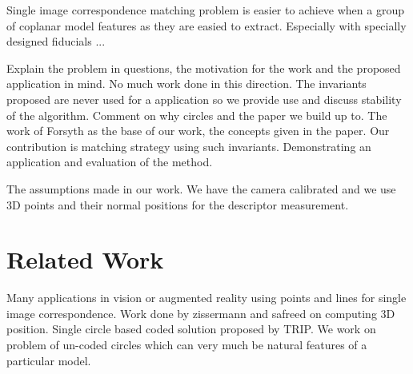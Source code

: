 \documentclass{bmvc2k}
\begin{document}
Single image correspondence matching problem is easier to achieve when a group of coplanar model features as they are easied to 
extract. Especially with specially designed fiducials ...    

Explain the problem in questions, the motivation for the work and the proposed application in mind.
No much work done in this direction. The invariants proposed are never used for a application so we provide use and discuss stability of the algorithm. Comment on why circles and the paper we build up to. 
The work of Forsyth as the base of our work, the concepts given in the paper. Our contribution is matching strategy using such invariants. Demonstrating an application and evaluation of the method. 

The assumptions made in our work. We have the camera calibrated and we use 3D points and their normal positions for the descriptor measurement. 




\section{Related Work}

Many applications in vision or augmented reality using points and lines for single image correspondence. 
Work done by zissermann and safreed on computing 3D position. Single circle based coded solution proposed by TRIP. 
We work on problem of un-coded circles which can very much be natural features of a particular model.  
\end{document}
